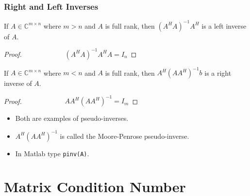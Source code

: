 \documentclass{beamer}
\begin{document}
\begin{frame}\frametitle{Right and Left Inverses}
	\begin{lemma}
		If $A\in\mathbb{C}^{m\times n}$ where $m>n$ and $A$ is full rank, then 	$ (A^HA)^{-1}A^H $ is a left inverse of $A$.
	\end{lemma}
	\begin{proof}
		$\qquad\qquad\qquad (A^HA)^{-1}A^HA = I_n$
	\end{proof}
	\begin{lemma}
		If $A\in\mathbb{C}^{m\times n}$ where $m<n$ and $A$ is full rank, then 	$A^H(AA^H)^{-1}b $ is a right inverse of $A$.
	\end{lemma}
	\begin{proof}
		$\qquad\qquad\qquad AA^H(AA^H)^{-1} = I_m$
	\end{proof}
	
	\begin{itemize}
		\item Both are examples of pseudo-inverses.
		\item $A^H(AA^H)^{-1}$ is called the Moore-Penrose pseudo-inverse.  
		\item In Matlab type \texttt{pinv(A)}.
	\end{itemize}
\end{frame}

\section{Matrix Condition Number}
\frame{\sectionpage}
\end{document}
